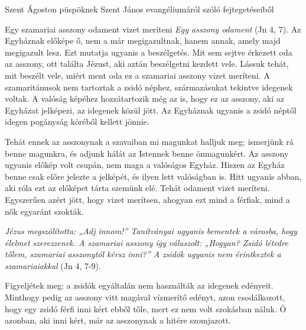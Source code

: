 \documentclass[twoside]{article}
\begin{document}


Szent Ágoston püspöknek Szent János evangéliumáról szóló fejtegetéseiből

{\centering{}}

\begin{lectio}{Egy szamariai asszony odament vizet meríteni}
\noindent \textit{Egy asszony odament} (Jn 4, 7). Az Egyháznak előképe ő, nem a már megigazultnak, %
hanem annak, amely majd megigazult lesz. Ezt mutatja ugyanis a beszélgetés. Mit sem sejtve %
érkezett oda az asszony, ott találta Jézust, aki aztán beszélgetni kezdett vele. Lássuk tehát, %
mit beszélt vele, miért ment oda ez a szamariai asszony vizet meríteni. A szamaritánusok nem %
tartoztak a zsidó néphez, származásukat tekintve idegenek voltak. A valóság képéhez hozzátartozik %
még az is, hogy ez az asszony, aki az Egyházat jelképezi, az idegenek közül jött. Az Egyháznak %
ugyanis a zsidó néptől idegen pogányság köréből kellett jönnie.

Tehát ennek az asszonynak a szavaiban mi magunkat halljuk meg; ismerjünk rá benne magunkra, és %
adjunk hálát az Istennek benne önmagunkért. Az asszony ugyanis előkép volt csupán, nem maga a %
valóságos Egyház. Hiszen az Egyház benne csak előre jelezte a jelképét, és ilyen lett valóságban %
is. Hitt ugyanis abban, aki róla ezt az előképet tárta szemünk elé. Tehát odament vizet meríteni. %
Egyszerűen azért jött, hogy vizet merítsen, ahogyan ezt mind a férfiak, mind a nők egyaránt szokták.

\textit{Jézus megszólította: „Adj innom!” Tanítványai ugyanis bementek a városba, hogy élelmet %
szerezzenek. A szamariai asszony így válaszolt: „Hogyan? Zsidó létedre tőlem, szamariai asszonytól %
kérsz inni?” A zsidók ugyanis nem érintkeztek a szamariaiakkal} (Jn 4, 7-9).

Figyeljétek meg: a zsidók egyáltalán nem használták az idegenek edényeit. Minthogy pedig az %
asszony vitt magával vízmerítő edényt, azon csodálkozott, hogy egy zsidó férfi inni kért ebből %
tőle, mert ez nem volt szokásban náluk. Ő azonban, aki inni kért, már az asszonynak a hitére %
szomjazott.


\end{lectio}
\end{document}
